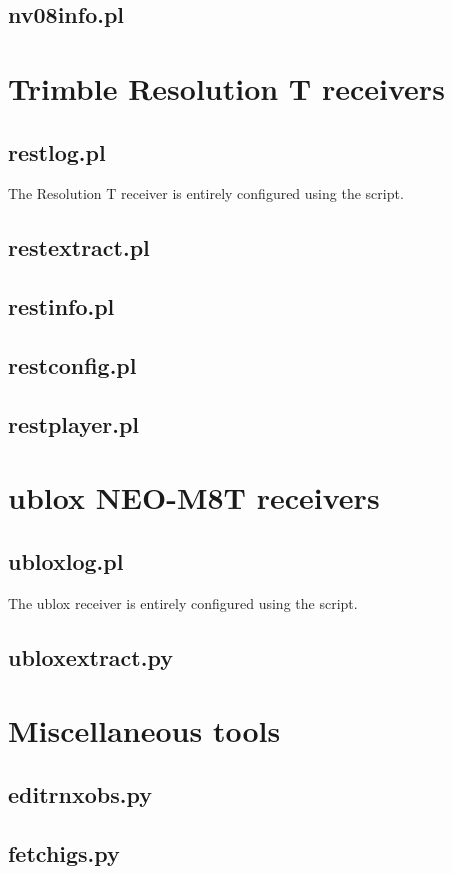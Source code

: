 \subsection{nv08info.pl}

\section{Trimble Resolution T receivers}

\subsection{restlog.pl}

\hypertarget{h:restlog}{}

The Resolution T receiver is entirely configured using the script.

\subsection{restextract.pl}

\subsection{restinfo.pl}

\subsection{restconfig.pl}

\subsection{restplayer.pl}

\section{ublox NEO-M8T receivers}

\subsection{ubloxlog.pl}

\hypertarget{h:ubloxlog}{}

The ublox receiver is entirely configured using the script.

\subsection{ubloxextract.py}




\section{Miscellaneous tools}







\subsection{editrnxobs.py}

\subsection{fetchigs.py}
